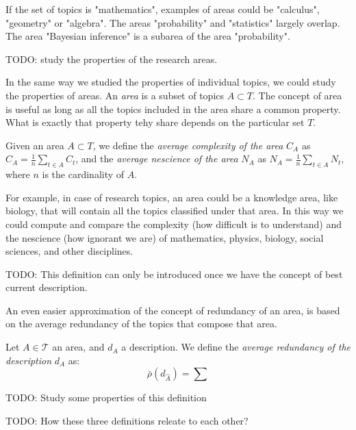 \begin{example}
If the set of topics is "mathematics", examples of areas could be "calculus", "geometry" or "algebra". The areas "probability" and "statistics" largely overlap. The area "Bayesian inference" is a subarea of the area "probability".
\end{example}

{\color{red} TODO: study the properties of the research areas.}

In the same way we studied the properties of individual topics, we could study the properties of areas. An \emph{area} is a subset of topics $A\subset T$. The concept of area is useful as long as all the topics included in the area share a common property. What is exactly that property tehy share depends on the particular set $T$.

\begin{definition}
Given an area $A\subset T$, we define the \emph{average complexity of the area} $C_{A}$ as $C_{A}=\frac{1}{n}\sum_{t\in A}C_{t}$, and the \emph{average nescience of the area} $N_{A}$ as $N_{A}=\frac{1}{n}\sum_{t\in A}N_{t}$, where $n$ is the cardinality of $A$.
\end{definition}

For example, in case of research topics, an area could be a knowledge area, like biology, that will contain all the topics classified under that area. In this way we could compute and compare the complexity (how difficult is to understand) and the nescience (how ignorant we are) of mathematics, physics, biology, social sciences, and other disciplines.

{\color{red} TODO: This definition can only be introduced once we have the concept of best current description.}

An even easier approximation of the concept of redundancy of an area, is based on the average redundancy of the topics that compose that area.

\begin{definition}
Let $A \in \mathcal{T}$ an area, and $d_A$ a description. We define the \emph{average redundancy of the description} $d_A$ as:
\[
\bar{\rho}(d_{\hat{A}}) = \sum
\]
\end{definition}

{\color{red} TODO: Study some properties of this definition}

{\color{red} TODO: How these three definitions releate to each other?}


%
%

